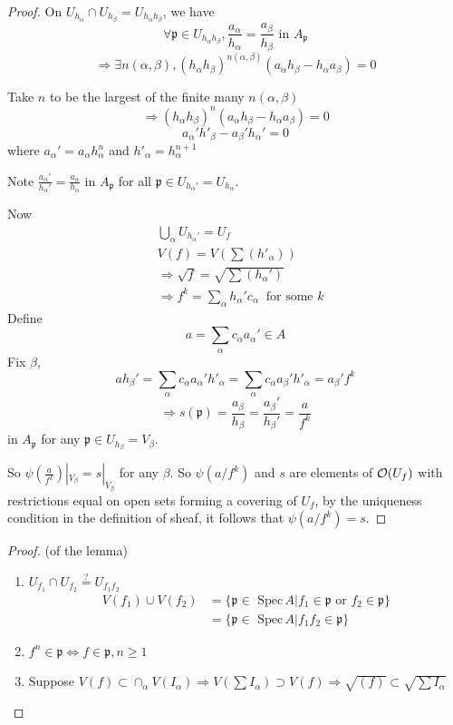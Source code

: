 \documentclass[11pt]{article}
\theoremstyle{definition}
\newcommand{\spec}{\text{ Spec}\,}
\newcommand{\scp}{{\mathfrak p}}
\newcommand{\calo}{{\cal O}}
\newcommand{\Lrta}{\Longrightarrow}
\newcommand{\Llrta}{\Longleftrightarrow}
\begin{document}
\begin{proof}
On $U_{h_\alpha}\cap U_{h_\beta}=U_{h_\alpha h_\beta}$, we have
$$
\forall \scp \in U_{h_\alpha h_\beta}, \frac{a_\alpha}{h_\alpha}=\frac{a_\beta}{h_\beta}\text{  in } A_\scp
$$
$$
\Lrta \exists n(\alpha, \beta), (h_\alpha h_\beta)^{n(\alpha, \beta)}(a_\alpha h_\beta-h_\alpha a_\beta)=0
$$

Take $n$ to be the largest of the finite many $n(\alpha,\beta)$
$$
\Lrta(h_\alpha h_\beta)^{n}(a_\alpha h_\beta-h_\alpha a_\beta)=0
$$
$$
a_\alpha' h'_\beta-a_\beta' h_\alpha'=0
$$
where $a_\alpha'=a_\alpha h_\alpha^n$ and $h'_\alpha=h_{\alpha}^{n+1}$

Note 
$\frac{a_\alpha'}{h_\alpha'}=\frac{a_\alpha}{h_\alpha}$ in $A_\scp$ for all $\scp\in U_{h_\alpha'}=U_{h_\alpha}$.

Now
$$
\begin{aligned}
& \bigcup_\alpha U_{h_\alpha'}=U_f\\
& V(f)=V(\sum (h'_\alpha))\\
&\Lrta \sqrt{f}=\sqrt{\sum(h_\alpha')}\\
& \Lrta f^k =\sum_\alpha h_\alpha' c_\alpha\ \text{ for some } k
\end{aligned}
$$
Define 
$$
a=\sum_\alpha c_\alpha a_\alpha'\in A
$$
Fix $\beta$,
$$
a h_\beta'=\sum_\alpha c_\alpha a_\alpha' h'_\alpha=\sum_\alpha c_\alpha a_\beta' h'_\alpha
=a_\beta' f^k
$$
$$
\Lrta s(\scp)=\frac{a_\beta}{h_\beta}= \frac{a_\beta'}{h_\beta'}=\frac{a
}{f^k}
$$
in $A_\scp $ for any $\scp \in U_{h_\beta}=V_\beta$.

So $\psi(\frac{a}{f^k})|_{V_\beta}=s|_{V_\beta}$ for any $\beta$.
So $\psi(a/f^k)$ and $s$ are elements of $\calo(U_f)$ with restrictions equal on open sets forming a covering of $U_f$, by the uniqueness condition in the definition of sheaf, it follows that $\psi(a/f^k)=s$.
\end{proof}


\begin{proof}(of the lemma)
\begin{enumerate}[label=(\arabic*)]
\item $U_{f_1}\cap U_{f_2}\overset{?}{=}U_{f_1 f_2}$
$$
\begin{aligned}
V(f_1)\cup V(f_2)&=\{\scp\in \spec A|f_1\in \scp \text{ or } f_2\in\scp \}\\
&=\{\scp\in\spec A|f_1f_2\in \scp\}
\end{aligned}
$$
\item $f^n\in \scp \Llrta f\in\scp, n\geq1$
\item Suppose $V(f)\subset \cap_\alpha V(I_\alpha)\Lrta V(\sum I_\alpha)\supset V(f)\Lrta \sqrt{(f)}\subset \sqrt{\sum I_\alpha}$
\end{enumerate}
\end{proof}
\end{document}
